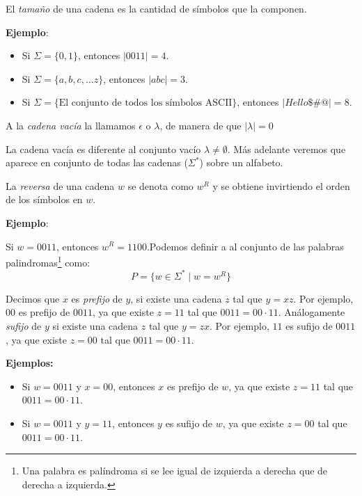 \begin{Def}
El \textit{tamaño} de una cadena es la cantidad de símbolos que la componen.
\end{Def}

\textbf{Ejemplo}:

\begin{itemize}
    \item Si $\Sigma = \{0,1\}$, entonces $|0011| = 4$.
    \item Si $\Sigma = \{a,b,c, \ldots z\}$, entonces $|abc| = 3$.
    \item Si $\Sigma = \{\text{El conjunto de todos los símbolos ASCII} \}$, entonces $|Hello\$\#@| = 8$.
\end{itemize}

\begin{Def}
A la \textit{cadena vacía} la llamamos $\epsilon$  o $\lambda$, de manera de que $|\lambda| = 0$
\end{Def}

La cadena vacía es diferente al conjunto vacío $\lambda \neq \emptyset$. Más adelante veremos que aparece en conjunto de todas las cadenas ($\Sigma^*$) sobre un alfabeto.
\begin{Def}
La \textit{reversa} de una cadena $w$ se denota como $w^R$ y se obtiene invirtiendo el orden de los símbolos en $w$.
\end{Def}

\textbf{Ejemplo}:

Si $w = 0011$, entonces $w^R = 1100$.Podemos definir a al conjunto de las palabras palindromas\footnote{Una palabra es palíndroma si se lee igual de izquierda a derecha que de derecha a izquierda.} 
como: $$P = \{ w \in \Sigma^* \mid w = w^R \}$$

\begin{Def}
Decimos que $x$ es \textit{prefijo} de $y$,  si existe una cadena $z$ tal que $y = xz$. Por ejemplo, $00$ es prefijo de $0011$, ya que existe $z = 11$ tal que $0011 = 00 \cdot 11$.
Análogamente \textit{sufijo} de $y$ si existe una cadena $z$ tal que $y = zx$. Por ejemplo, $11$ es sufijo de $0011$, ya que existe $z = 00$ tal que $0011 = 00 \cdot 11$.
\end{Def}

\textbf{Ejemplos:}

\begin{itemize}
    \item Si $w = 0011$ y $x = 00$, entonces $x$ es prefijo de $w$, ya que existe $z = 11$ tal que $0011 = 00 \cdot 11$.
    \item Si $w = 0011$ y $y = 11$, entonces $y$ es sufijo de $w$, ya que existe $z = 00$ tal que $0011 = 00 \cdot 11$.
\end{itemize}
